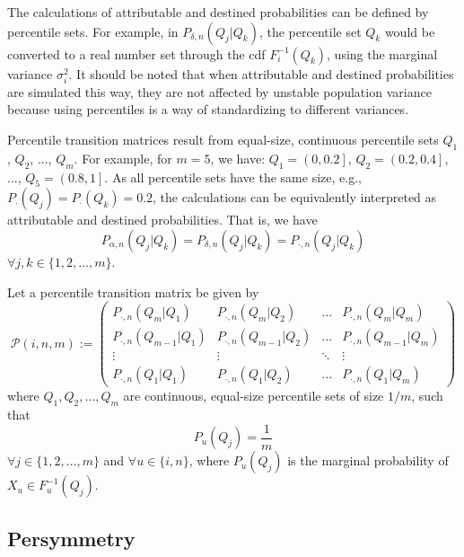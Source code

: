 \documentclass{svproc} %
\begin{document}
The calculations of attributable and destined probabilities can be defined by percentile sets. For example, in $P_{\delta , n}(Q_j | Q_k)$, the percentile set $Q_k$ would be converted to a real number set through the cdf $F_i^{-1}(Q_k)$, using the marginal variance $\sigma_i^2$. It should be noted that when attributable and destined probabilities are simulated this way, they are not affected by unstable population variance because using percentiles is a way of standardizing to different variances. 

Percentile transition matrices result from equal-size, continuous percentile sets $Q_1$, $Q_2$, ..., $Q_m$. For example, for $m=5$, we have: $Q_1 = \left(0, 0.2\right]$, $Q_2 = \left(0.2, 0.4\right]$, ..., $Q_5 = \left(0.8, 1\right]$. As all percentile sets have the same size, e.g., $P_{\cdot}(Q_j) = P_{\cdot}(Q_k) = 0.2$, the calculations can be equivalently interpreted as attributable and destined probabilities. That is, we have 
\begin{equation}
P_{\alpha , n}(Q_j | Q_k) = P_{\delta , n}(Q_j | Q_k) = P_{\cdot , n}(Q_j | Q_k)
\label{eq:ad_eq}
\end{equation}
$\forall j, k \in \{1, 2, \dots , m\}$.


\begin{definition}
Let a percentile transition matrix be given by 
\begin{equation}
\mathcal{P}(i, n, m) := 
\begin{pmatrix}
P_{\cdot , n}(Q_m | Q_1) &  P_{\cdot , n}(Q_m | Q_2)  & \ldots & P_{\cdot , n}(Q_m | Q_m)\\
P_{\cdot , n}(Q_{m-1} | Q_1)  &  P_{\cdot , n}(Q_{m-1} | Q_2) & \ldots & P_{\cdot , n}(Q_{m-1} | Q_m)\\
\vdots & \vdots & \ddots & \vdots\\
P_{\cdot , n}(Q_1 | Q_1)  &   P_{\cdot , n}(Q_1 | Q_2)       &\ldots & P_{\cdot , n}(Q_1 | Q_m) 
\end{pmatrix}
\label{eq:ptm}
\end{equation}
where $Q_1, Q_2, \dots , Q_m$ are continuous, equal-size percentile sets of size $1/m$, such that 
\begin{equation}
P_u(Q_j) = \frac{1}{m}
\label{eq:size}
\end{equation}
$\forall j \in \{1, 2, \dots , m\}$ and $\forall u \in \{i, n\}$, where $P_u(Q_j)$ is the marginal probability of $X_u \in F_u^{-1}(Q_j)$.
\label{def:ptm}
\end{definition}

 
\subsection{Persymmetry} 
\end{document}

